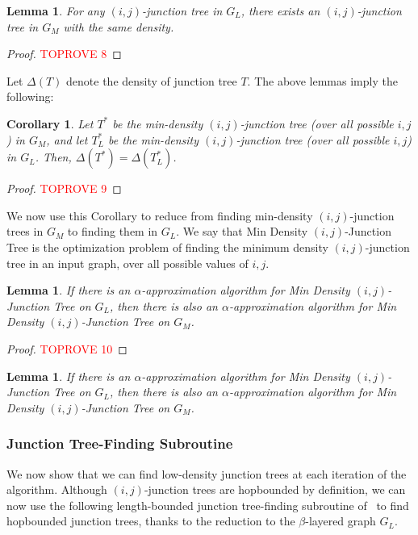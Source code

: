 \documentclass{article}
\newtheorem{corollary}[theorem]{Corollary}
\newtheorem{lemma}[theorem]{Lemma}
\theoremstyle{definition}
\theoremstyle{remark}
\def\jt {{\sc Min Density $(i,j)$-Junction Tree}}
\begin{document}
\begin{lemma}
\label{cl:layered_to_input}
    For any $(i,j)$-junction tree in $G_L$, there exists an $(i,j)$-junction tree in $G_M$ with the same density.
\end{lemma}
\begin{proof}\textcolor{red}{TOPROVE 8}\end{proof}

Let $\Delta(T)$ denote the density of junction tree $T$. The above lemmas imply the following:

\begin{corollary}
\label{cor:equivalent}
    Let $T^*$ be the min-density $(i,j)$-junction tree (over all possible $i,j$) in $G_M$, and let $T_L^*$ be the min-density $(i,j)$-junction tree (over all possible $i,j$) in $G_L$. Then, $\Delta(T^*) = \Delta(T_L^*)$.
\end{corollary}
\begin{proof}\textcolor{red}{TOPROVE 9}\end{proof}

We now use this Corollary to reduce from finding min-density $(i,j)$-junction trees in $G_M$ to finding them in $G_L$. We say that {\jt} is the optimization problem of finding the minimum density $(i,j)$-junction tree in an input graph, over all possible values of $i,j$.

\begin{lemma}
\label{lem:reduction}
     If there is an $\alpha$-approximation algorithm for {\jt} on $G_L$, then there is also an $\alpha$-approximation algorithm for {\jt} on $G_M$. 
\end{lemma}
\begin{proof}\textcolor{red}{TOPROVE 10}\end{proof}

\else
\begin{lemma}
\label{lem:reduction}
     If there is an $\alpha$-approximation algorithm for {\jt} on $G_L$, then there is also an $\alpha$-approximation algorithm for {\jt} on $G_M$. 
\end{lemma}
\fi

\subsubsection{Junction Tree-Finding Subroutine}
We now show that we can find low-density junction trees at each iteration of the algorithm. Although $(i,j)$-junction trees are hopbounded by definition,  we can now use the following length-bounded junction tree-finding subroutine of~\cite{GKL23} to find hopbounded junction trees, thanks to the reduction to the $\beta$-layered graph $G_L$.
\end{document}
